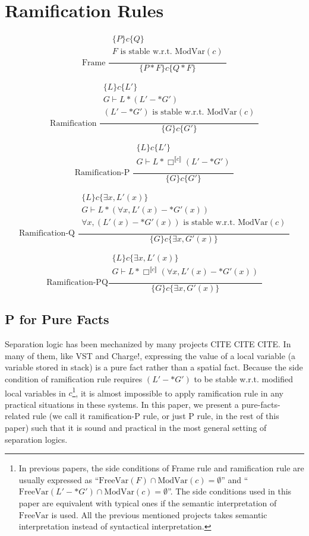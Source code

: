 \section{Ramification Rules}

\newcommand{\Rule}[3]{\[\text{#1}\frac{\begin{array}{c} #2 \end{array}}{#3}\]}
\newcommand{\MV}{\text{ModVar}}
\newcommand{\FV}{\text{FreeVar}}

\Rule{Frame  }
{\{ P \} c \{Q \} \\
  F \text{ is stable w.r.t. } \MV(c)\\}
 {\{P * F \} c \{ Q * F \}}

\Rule{Ramification   }
{\{ L \} c \{L' \} \\
 G \vdash L * (L' -* G') \\
 (L' -* G') \text{ is stable w.r.t. } \MV(c)\\}
{\{ G \} c \{ G' \}}

\Rule{Ramification-P }
{\{ L \} c \{L' \} \\
 G \vdash L * \Box^{\llbracket c \rrbracket} (L' -* G') \\}
{\{ G \} c \{ G' \}}

\Rule{Ramification-Q }
{\{ L \} c \{ \exists x, L' (x) \} \\
 G \vdash L * (\forall x, L' (x) -* G' (x)) \\
 \forall x, (L'(x) -* G'(x)) \text{ is stable w.r.t. } \MV(c)\\}
{\{ G \} c \{ \exists x, G' (x)\}}

\Rule{Ramification-PQ}
{\{ L \} c \{ \exists x, L' (x) \} \\
 G \vdash L * \Box^{\llbracket c \rrbracket} (\forall x, L' (x) -* G' (x)) \\}
{\{ G \} c \{ \exists x, G' (x)\}}

\subsection{P for Pure Facts}

Separation logic has been mechanized by many projects CITE CITE CITE.
In many of them, like VST and Charge!, expressing the value of a local
variable (a variable stored in stack) is a pure fact rather than a
spatial fact. Because the side condition of ramification rule requires $(L' -* G')$ to be stable w.r.t. modified local variables in $c$\footnote{In previous papers, the side conditions of Frame rule and ramification rule are usually expressed as ``$\FV(F) \cap \MV(c) = \emptyset$'' and ``$\FV(L' -* G') \cap \MV(c) = \emptyset$''. The side conditions used in this paper are equivalent with typical ones if the semantic interpretation of $\FV$ is used. All the previous mentioned projects takes semantic interpretation instead of syntactical interpretation.}, it is almost impossible to apply ramification rule in any practical situations in these systems. In this paper, we present a pure-facts-related rule (we call it ramification-P rule, or just P rule, in the rest of this paper) such that it is sound and practical in the most general setting of separation logics.

